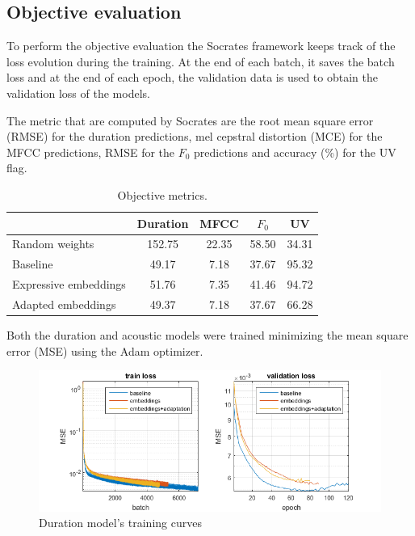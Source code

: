 \subsection{Objective evaluation}

To perform the objective evaluation the Socrates framework keeps track of the loss evolution during the training. At the end of each batch, it saves the batch loss and at the end of each epoch, the validation data is used to obtain the validation loss of the models.

The metric that are computed by Socrates are the root mean square error (RMSE) for the duration predictions, mel cepstral distortion \cite{mashimo2001evaluation} (MCE) for the MFCC predictions, RMSE for the $F_0$ predictions and accuracy (\%) for the UV flag. 

\begin{table}[h]
    \centering
    \begin{tabular}{|l|c|c|c|c|}
        \hline
                     & Duration &  MFCC & $F_0$ & UV \\
        \hline
        Random weights  & 152.75   & 22.35 & 58.50 & 34.31 \\
        Baseline     & 49.17    & 7.18  & 37.67 & 95.32 \\
        Expressive embeddings     & 51.76    & 7.35  & 41.46 & 94.72 \\
        Adapted embeddings     & 49.37    & 7.18  & 37.67 & 66.28 \\
        \hline
    \end{tabular}
    \caption{Objective metrics.}
\end{table}

Both the duration and acoustic models were trained minimizing the mean square error (MSE) using the Adam \cite{kingma2014adam} optimizer.

\begin{figure}[h]
    \centering
    \includegraphics[width=14cm]{figures/duration}
    \caption{Duration model's training curves}
\end{figure}

